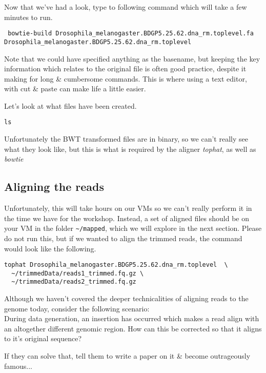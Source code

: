 \begin{steps}
Now that we've had a look, type to following command which will take a few minutes to run.
\begin{lstlisting}
 bowtie-build Drosophila_melanogaster.BDGP5.25.62.dna_rm.toplevel.fa Drosophila_melanogaster.BDGP5.25.62.dna_rm.toplevel
\end{lstlisting}
Note that we could have specified anything as the basename, but keeping the key information which relates to the original file is often good practice, despite it making for long \& cumbersome commands.
This is where using a text editor, with cut \& paste can make life a little easier.
\end{steps}

\begin{steps}
Let's look at what files have been created.
\begin{lstlisting}
ls
\end{lstlisting}
Unfortunately the BWT transformed files are in binary, so we can't really see what they look like, but this is what is required by the aligner \textit{tophat}, as well as \textit{bowtie} 
\end{steps}

\subsection{Aligning the reads}
Unfortunately, this will take hours on our VMs so we can't really perform it in the time we have for the workshop.
Instead, a set of aligned files should be on your VM in the folder \texttt{\~{}/mapped}, which we will explore in the next section.
Please do not run this, but if we wanted to align the trimmed reads, the command would look like the following.
\begin{lstlisting}
tophat Drosophila_melanogaster.BDGP5.25.62.dna_rm.toplevel  \
  ~/trimmedData/reads1_trimmed.fq.gz \
  ~/trimmedData/reads2_trimmed.fq.gz
\end{lstlisting}

\begin{advanced}
\begin{questions}
Although we haven't covered the deeper technicalities of aligning reads to the genome today, consider the following scenario:\\

During data generation, an insertion has occurred which makes a read align with an altogether different genomic region.
How can this be corrected so that it aligns to it's original sequence? \\
\begin{answer}
If they can solve that, tell them to write a paper on it \& become outrageously famous...
\end{answer}
\end{questions}
\end{advanced}